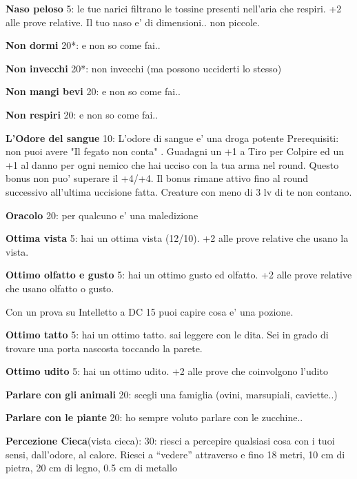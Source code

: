 \documentclass[a4paper,11pt,twoside,openany]{book}
\begin{document}
\textbf{Naso peloso} 5: le tue narici filtrano le tossine presenti nell'aria che respiri. +2 alle prove relative. Il tuo naso e' di dimensioni.. non piccole.

\textbf{Non dormi} 20{*}: e non so come fai..

\textbf{Non invecchi} 20{*}: non invecchi (ma possono ucciderti lo stesso)

\textbf{Non mangi bevi} 20: e non so come fai..

\textbf{Non respiri} 20: e non so come fai..

\textbf{L'Odore del sangue} 10: L'odore di sangue e' una droga potente
Prerequisiti: non puoi avere "Il fegato non conta" . Guadagni un +1 a Tiro per Colpire ed un +1 al danno per ogni nemico che hai ucciso con la tua arma nel round. Questo bonus non puo' superare il +4/+4. Il bonus rimane attivo fino al round successivo all'ultima uccisione fatta. Creature con meno di 3 lv di te non contano.

\textbf{Oracolo} 20: per qualcuno e' una maledizione

\textbf{Ottima vista} 5: hai un ottima vista (12/10). +2 alle prove relative che usano la vista.

\textbf{Ottimo olfatto e gusto} 5: hai un ottimo gusto ed olfatto. +2 alle prove relative che usano olfatto o gusto.

Con un prova su Intelletto a DC 15 puoi capire cosa e' una pozione.

\textbf{Ottimo tatto} 5: hai un ottimo tatto. sai leggere con le dita. Sei in grado di trovare una porta nascosta toccando la parete.

\textbf{Ottimo udito} 5: hai un ottimo udito. +2 alle prove che coinvolgono l'udito

\textbf{Parlare con gli animali} 20: scegli una famiglia (ovini, marsupiali, caviette..)

\textbf{Parlare con le piante} 20: ho sempre voluto parlare con le zucchine..

\textbf{Percezione Cieca}(vista cieca): 30: riesci a percepire qualsiasi cosa con i tuoi sensi, dall’odore, al calore. Riesci a “vedere” attraverso e fino 18 metri, 10 cm di pietra, 20 cm di legno, 0.5 cm di metallo
\end{document}
